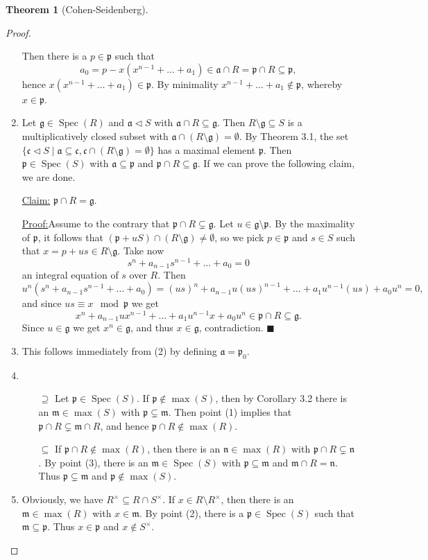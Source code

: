 \documentclass[12pt,a4paper]{report}
\theoremstyle{definition}
\newtheorem{theorem}{Theorem}[chapter] %
\theoremstyle{num.custom-title}
\newenvironment{claim}[1]{\par\noindent\underline{Claim#1:}\space}{} %
\newenvironment{claimproof}[1]{\par\noindent\underline{Proof:}\space#1}{\leavevmode\unskip\penalty9999 \hbox{}\nobreak\hfill\quad\hbox{$\blacksquare$}} %
\DeclareMathOperator{\sm}{\setminus}
\DeclareMathOperator{\sse}{\subseteq}
\DeclareMathOperator{\Spec}{Spec}
\newcommand{\g}{\mathfrak{g}}
\newcommand{\p}{\mathfrak{p}}
\newcommand{\m}{\mathfrak{m}}
\begin{document}
\begin{theorem}[Cohen-Seidenberg]
\begin{proof}
\begin{enumerate}
Then there is a $p \in \p$ such that
\[
a_0 = p - x(x^{n-1} + \ldots + a_1) \in \mathfrak{a} \cap R = \p \cap R \sse \p,
\]
hence $x(x^{n-1} + \ldots + a_1) \in \p$. By minimality $x^{n-1} + \ldots + a_1 \not\in \p$, whereby $x \in \p$.
\item Let $\g \in \Spec(R)$ and $\mathfrak{a} \lhd S$ with $\mathfrak{a} \cap R \sse \g$. Then $R \sm \g \sse S$ is a multiplicatively closed subset with $\mathfrak{a} \cap (R \sm \g) = \emptyset$. By Theorem 3.1, the set $\{ \mathfrak{c} \lhd S \mid \mathfrak{a} \sse \mathfrak{c}, \mathfrak{c} \cap (R \sm \g) = \emptyset \}$ has a maximal element $\p$. Then $\p \in \Spec(S)$ with $\mathfrak{a} \sse \p$ and $\p \cap R \sse \g$. If we can prove the following claim, we are done.
\begin{claim}{}
$\p \cap R = \g$.
\begin{claimproof}
Assume to the contrary that $\p \cap R \subsetneq \g$. Let $u \in \g \sm \p$. By the maximality of $\p$, it follows that $(\p + uS) \cap (R \sm \g) \neq \emptyset$, so we pick $p \in \p$ and $s \in S$ such that $x = p+us \in R \sm \g$. Take now
\[
s^n+a_{n-1}s^{n-1} + \ldots + a_0 = 0
\]
an integral equation of $s$ over $R$. Then
\[
u^n (s^n+a_{n-1}s^{n-1} + \ldots + a_0) = (us)^n + a_{n-1} u (us)^{n-1} + \ldots + a_1 u^{n-1} (us) + a_0 u^n = 0,
\]
and since $us \equiv x \mod \p$ we get
\[
x^n + a_{n-1} u x^{n-1} + \ldots + a_1 u^{n-1} x + a_0 u^n \in \p \cap R \sse \g.
\]
Since $u \in \g$ we get $x^n \in \g$, and thus $x \in \g$, contradiction.
\end{claimproof}
\end{claim}
\item This follows immediately from (2) by defining $\mathfrak{a} = \p_0$.
\item 
\begin{itemize}
\item[$\supseteq$] Let $\p \in \Spec(S)$. If $\p \not\in \max(S)$, then by Corollary 3.2 there is an $\m \in \max(S)$ with $\p \subsetneq \m$. Then point (1) implies that $\p \cap R \subsetneq \m \cap R$, and hence $\p \cap R \not\in \max(R)$.
\item[$\sse$] If $\p \cap R \not\in \max(R)$, then there is an $\mathfrak{n} \in \max(R)$ with $\p \cap R \subsetneq \mathfrak{n}$. By point (3), there is an $\m \in \Spec(S)$ with $\p \sse \m$ and $\m \cap R = \mathfrak{n}$. Thus $\p \subsetneq \m$ and $\p \not\in \max(S)$.
\end{itemize}
\item Obviously, we have $R^\times \sse R \cap S^\times$. If $x \in R \sm R^\times$, then there is an $\m \in \max(R)$ with $x \in \m$. By point (2), there is a $\p \in \Spec(S)$ such that $\m \sse \p$. Thus $x \in \p$ and $x \not\in S^\times$.\\

\end{enumerate}
\end{proof}
\end{theorem}
\end{document}
